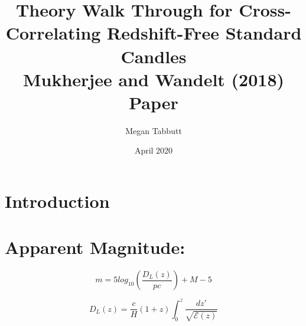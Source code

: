 \documentclass{article}
\title{ {\bf Theory Walk Through for Cross-Correlating Redshift-Free Standard Candles} \\
\vspace{10pt}
\LARGE Mukherjee and Wandelt (2018) Paper}
\date{April 2020}
\author{Megan Tabbutt}
\begin{document}
\doublespacing
\maketitle



\fontsize{11}{12}

\section{Introduction}

\section{Apparent Magnitude:}

\begin{equation}
m = 5 log_{10}(\frac{D_{L}(z)}{pc}) + M - 5
\end{equation}

\begin{equation}
D_{L}(z) = \frac{c}{H}(1 + z) \int_{0}^{z} \frac{dz'}{\sqrt{\mathcal{E}(z)}}
\end{equation}
\end{document}
